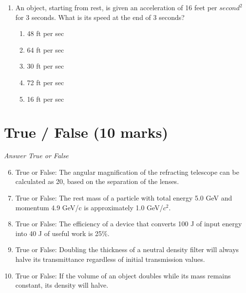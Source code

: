 \documentclass[12pt]{article}
\begin{document}
\begin{enumerate}[label=\arabic*.]
\begin{enumerate}[label=(\alph*)]
    \item Perseus
    \item Ursa Major
    \item Sagittarius
    \item Aquila
\end{enumerate}
\item An object, starting from rest, is given an acceleration of 16 feet per $second^2$ for 3 seconds. What is its speed at the end of 3 seconds?
\begin{enumerate}[label=(\alph*)]
    \item 48 ft per sec
    \item 64 ft per sec
    \item 30 ft per sec
    \item 72 ft per sec
    \item 16 ft per sec
\end{enumerate}
\end{enumerate}

\section*{True / False (10 marks)}
\textit{Answer True or False}
\begin{enumerate}[label=\arabic*.]
\setcounter{enumi}{5}
\item True or False: The angular magnification of the refracting telescope can be calculated as 20, based on the separation of the lenses.
\item True or False: The rest mass of a particle with total energy 5.0 GeV and momentum 4.9 GeV/c is approximately 1.0 GeV/$c^2$.
\item True or False: The efficiency of a device that converts 100 J of input energy into 40 J of useful work is 25\%.
\item True or False: Doubling the thickness of a neutral density filter will always halve its transmittance regardless of initial transmission values.
\item True or False: If the volume of an object doubles while its mass remains constant, its density will halve.
\end{enumerate}
\end{document}
